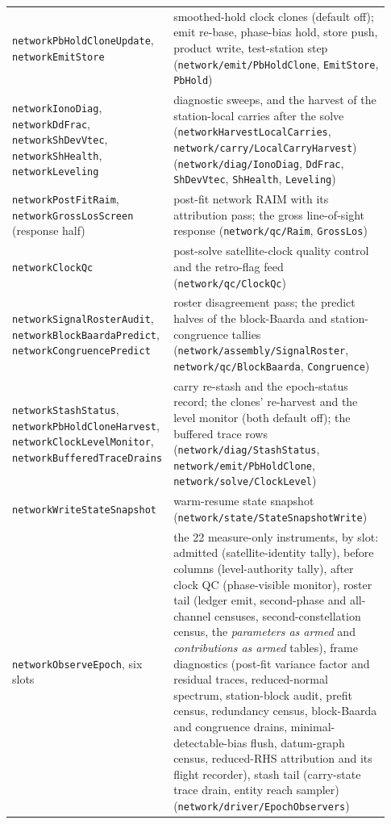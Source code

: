 \documentclass[main.tex]{subfiles}
\begin{document}
{\begin{longtable}{@{}>{\raggedright\arraybackslash}p{0.335\linewidth}>{\raggedright\arraybackslash}p{0.595\linewidth}@{}}
\texttt{networkPbHoldCloneUpdate}, \texttt{networkEmitStore} & smoothed-hold clock clones (default off); emit re-base, phase-bias hold, store push, product write, test-station step (\texttt{network/emit/PbHoldClone}, \texttt{EmitStore}, \texttt{PbHold}) \\
\texttt{networkIonoDiag}, \texttt{networkDdFrac}, \texttt{networkShDevVtec}, \texttt{networkShHealth}, \texttt{networkLeveling} & diagnostic sweeps, and the harvest of the station-local carries after the solve (\texttt{networkHarvestLocalCarries}, \texttt{network/carry/LocalCarryHarvest}) (\texttt{network/diag/IonoDiag}, \texttt{DdFrac}, \texttt{ShDevVtec}, \texttt{ShHealth}, \texttt{Leveling}) \\
\texttt{networkPostFitRaim}, \texttt{networkGrossLosScreen} (response half) & post-fit network RAIM with its attribution pass; the gross line-of-sight response (\texttt{network/qc/Raim}, \texttt{GrossLos}) \\
\texttt{networkClockQc} & post-solve satellite-clock quality control and the retro-flag feed (\texttt{network/qc/ClockQc}) \\
\texttt{networkSignalRosterAudit}, \texttt{networkBlockBaardaPredict}, \texttt{networkCongruencePredict} & roster disagreement pass; the predict halves of the block-Baarda and station-congruence tallies (\texttt{network/assembly/SignalRoster}, \texttt{network/qc/BlockBaarda}, \texttt{Congruence}) \\
\texttt{networkStashStatus}, \texttt{networkPbHoldCloneHarvest}, \texttt{networkClockLevelMonitor}, \texttt{networkBufferedTraceDrains} & carry re-stash and the epoch-status record; the clones' re-harvest and the level monitor (both default off); the buffered trace rows (\texttt{network/diag/StashStatus}, \texttt{network/emit/PbHoldClone}, \texttt{network/solve/ClockLevel}) \\
\texttt{networkWriteStateSnapshot} & warm-resume state snapshot (\texttt{network/state/StateSnapshotWrite}) \\
\midrule
\texttt{networkObserveEpoch}, six slots & the 22 measure-only instruments, by slot: admitted (satellite-identity tally), before columns (level-authority tally), after clock QC (phase-visible monitor), roster tail (ledger emit, second-phase and all-channel censuses, second-constellation census, the \emph{parameters as armed} and \emph{contributions as armed} tables), frame diagnostics (post-fit variance factor and residual traces, reduced-normal spectrum, station-block audit, prefit census, redundancy census, block-Baarda and congruence drains, minimal-detectable-bias flush, datum-graph census, reduced-RHS attribution and its flight recorder), stash tail (carry-state trace drain, entity reach sampler) (\texttt{network/driver/EpochObservers}) \\
\bottomrule
\end{longtable}}
\end{document}
